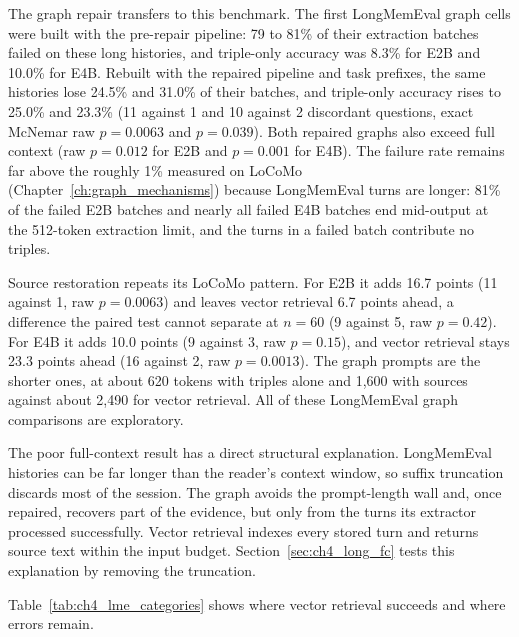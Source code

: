 The graph repair transfers to this benchmark. The first LongMemEval graph cells were built with the
pre-repair pipeline: 79 to 81\% of their extraction batches failed on these long histories, and
triple-only accuracy was 8.3\% for E2B and 10.0\% for E4B. Rebuilt with the repaired pipeline and
task prefixes, the same histories lose 24.5\% and 31.0\% of their batches, and triple-only accuracy
rises to 25.0\% and 23.3\% (11 against 1 and 10 against 2 discordant questions, exact McNemar raw
$p=0.0063$ and $p=0.039$). Both repaired graphs also exceed full context (raw $p=0.012$ for E2B and
$p=0.001$ for E4B). The failure rate remains far above the roughly 1\% measured on LoCoMo
(Chapter~\ref{ch:graph_mechanisms}) because LongMemEval turns are longer: 81\% of the failed E2B
batches and nearly all failed E4B batches end mid-output at the 512-token extraction limit, and
the turns in a failed batch contribute no triples.

Source restoration repeats its LoCoMo pattern. For E2B it adds 16.7 points (11 against 1, raw
$p=0.0063$) and leaves vector retrieval 6.7 points ahead, a difference the paired test cannot
separate at $n=60$ (9 against 5, raw $p=0.42$). For E4B it adds 10.0 points (9 against 3, raw
$p=0.15$), and vector retrieval stays 23.3 points ahead (16 against 2, raw $p=0.0013$). The graph
prompts are the shorter ones, at about 620 tokens with triples alone and 1,600 with sources against
about 2,490 for vector retrieval. All of these LongMemEval graph comparisons are exploratory.

The poor full-context result has a direct structural explanation. LongMemEval histories can be far
longer than the reader's context window, so suffix truncation discards most of the session. The
graph avoids the prompt-length wall and, once repaired, recovers part of the evidence, but only from
the turns its extractor processed successfully. Vector retrieval indexes every stored turn and
returns source text within the input budget. Section~\ref{sec:ch4_long_fc} tests this explanation
by removing the truncation.

Table~\ref{tab:ch4_lme_categories} shows where vector retrieval succeeds and where errors remain.

